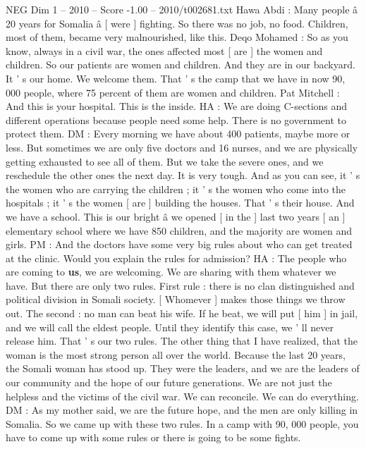 \begin{textsample}{NEG Dim 1 – 2010 – Score -1.00 – 2010/t002681.txt}  \label{ex:f1_neg_054}
Hawa Abdi : Many people â 20 years for Somalia â [ were ] fighting.
So there was no job, no food.
Children, most of them, became very malnourished, like this.
Deqo Mohamed : So as you know, always in a civil war, the ones affected most [ are ] the women and children.
So our patients are women and children.
And they are in our backyard.
It ' s our home.
We welcome them.
That ' s the camp that we have in now 90, 000 people, where 75 percent of them are women and children.
Pat Mitchell : And this is your hospital.
This is the inside.
HA : We are doing C-sections and different operations because people need some help.
There is no government to protect them.
DM : Every morning we have about 400 patients, maybe more or less.
But sometimes we are only five doctors and 16 nurses, and we are physically getting exhausted to see all of them.
But we take the severe ones, and we reschedule the other ones the next day.
It is very tough.
And as you can see, it ' s the women who are carrying the children ; it ' s the women who come into the hospitals ; it ' s the women [ are ] building the houses.
That ' s their house.
And we have a school.
This is our bright â we opened [ in the ] last two years [ an ] elementary school where we have 850 children, and the majority are women and girls.
PM : And the doctors have some very big rules about who can get treated at the clinic.
Would you explain the rules for admission?
HA : The people who are coming to \textbf{us}, we are welcoming.
We are sharing with them whatever we have.
But there are only two rules.
First rule : there is no clan distinguished and political division in Somali society. [ Whomever ] makes those things we throw out.
The second : no man can beat his wife.
If he beat, we will put [ him ] in jail, and we will call the eldest people.
Until they identify this case, we ' ll never release him.
That ' s our two rules.
The other thing that I have realized, that the woman is the most strong person all over the world.
Because the last 20 years, the Somali woman has stood up.
They were the leaders, and we are the leaders of our community and the hope of our future generations.
We are not just the helpless and the victims of the civil war.
We can reconcile.
We can do everything.
DM : As my mother said, we are the future hope, and the men are only killing in Somalia.
So we came up with these two rules.
In a camp with 90, 000 people, you have to come up with some rules or there is going to be some fights.

\end{textsample}
